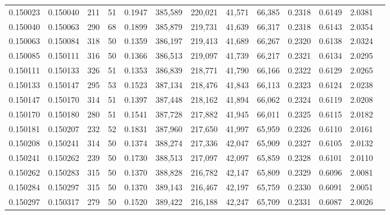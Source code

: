 \begin{tabular}{rrrrrrrrrrrrr}
0.150023 & 0.150040 &   211 &  51 &                                     0.1947 & 385,589 & 220,021 &  41,571 &  66,385 & 0.2318 & 0.6149 & 2.0381 \\
0.150040 & 0.150063 &   290 &  68 &                                     0.1899 & 385,879 & 219,731 &  41,639 &  66,317 & 0.2318 & 0.6143 & 2.0354 \\
0.150063 & 0.150084 &   318 &  50 &                                     0.1359 & 386,197 & 219,413 &  41,689 &  66,267 & 0.2320 & 0.6138 & 2.0324 \\
0.150085 & 0.150111 &   316 &  50 &                                     0.1366 & 386,513 & 219,097 &  41,739 &  66,217 & 0.2321 & 0.6134 & 2.0295 \\
0.150111 & 0.150133 &   326 &  51 &                                     0.1353 & 386,839 & 218,771 &  41,790 &  66,166 & 0.2322 & 0.6129 & 2.0265 \\
0.150133 & 0.150147 &   295 &  53 &                                     0.1523 & 387,134 & 218,476 &  41,843 &  66,113 & 0.2323 & 0.6124 & 2.0238 \\
0.150147 & 0.150170 &   314 &  51 &                                     0.1397 & 387,448 & 218,162 &  41,894 &  66,062 & 0.2324 & 0.6119 & 2.0208 \\
0.150170 & 0.150180 &   280 &  51 &                                     0.1541 & 387,728 & 217,882 &  41,945 &  66,011 & 0.2325 & 0.6115 & 2.0182 \\
0.150181 & 0.150207 &   232 &  52 &                                     0.1831 & 387,960 & 217,650 &  41,997 &  65,959 & 0.2326 & 0.6110 & 2.0161 \\
0.150208 & 0.150241 &   314 &  50 &                                     0.1374 & 388,274 & 217,336 &  42,047 &  65,909 & 0.2327 & 0.6105 & 2.0132 \\
0.150241 & 0.150262 &   239 &  50 &                                     0.1730 & 388,513 & 217,097 &  42,097 &  65,859 & 0.2328 & 0.6101 & 2.0110 \\
0.150262 & 0.150283 &   315 &  50 &                                     0.1370 & 388,828 & 216,782 &  42,147 &  65,809 & 0.2329 & 0.6096 & 2.0081 \\
0.150284 & 0.150297 &   315 &  50 &                                     0.1370 & 389,143 & 216,467 &  42,197 &  65,759 & 0.2330 & 0.6091 & 2.0051 \\
0.150297 & 0.150317 &   279 &  50 &                                     0.1520 & 389,422 & 216,188 &  42,247 &  65,709 & 0.2331 & 0.6087 & 2.0026 \\

\end{tabular}
